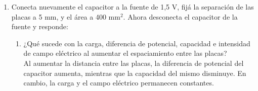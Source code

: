 \documentclass[12pt]{report}
\begin{document}
\begin{enumerate}
\begin{enumerate}
\begin{figure}[h]
\begin{minipage}[h]{0.4\textwidth}
       \end{minipage}
      \end{figure}

            \vspace{10cm}

        
    \end{enumerate}
    \item Conecta nuevamente el capacitor a la fuente de 1,5 V, fijá la separación de las placas a 5 mm, y el área a 400 mm$^2$. Ahora desconecta el capacitor de la fuente y responde:
    \begin{enumerate}
        \item ¿Qué sucede con la carga, diferencia de potencial, capacidad e intensidad de campo eléctrico al aumentar el espaciamiento entre las placas?\\

        Al aumentar la distancia entre las placas, la diferencia de potencial del capacitor aumenta, mientras que la capacidad del mismo disminuye. En cambio, la carga  y el campo eléctrico permanecen constantes.\\


\end{enumerate}
\end{enumerate}
\end{document}
